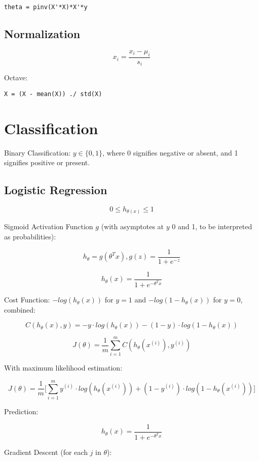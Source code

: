 \documentclass[a4paper,11pt]{scrartcl}
\begin{document}
\begin{verbatim}
theta = pinv(X'*X)*X'*y
\end{verbatim}

\subsection{Normalization}

$$ x_i = \frac{x_i - \mu_i}{s_i} $$

Octave:

\begin{verbatim}
X = (X - mean(X)) ./ std(X)
\end{verbatim}

\section{Classification}

Binary Classification: $y \in \{0, 1\}$, where 0 signifies negative or absent, and 1 signifies positive or present.

\subsection{Logistic Regression}

$$ 0 \leq h_{\theta(x)} \leq 1 $$

Sigmoid Activation Function $g$ (with asymptotes at $y$ 0 and 1, to be interpreted as probabilities):

$$ h_{\theta} = g(\theta^{T}x), g(z) = \frac{1}{1 + e^{-z}} $$

$$ h_{\theta}(x) = \frac{1}{1+e^{-\theta^{T}x}} $$

Cost Function: $-log(h_{\theta}(x))$ for $y=1$ and $-log(1-h_{\theta}(x))$ for $y=0$, combined:

$$ C(h_{\theta}(x),y) = -y \cdot log(h_{\theta}(x)) - (1-y) \cdot log(1-h_{\theta}(x)) $$

$$ J(\theta)=\frac{1}{m} \sum^m_{i=1} C(h_{\theta}(x^{(i)}),y^{(i)}) $$

With maximum likelihood estimation:

$$ J(\theta) = \frac{1}{m} \Bigg[ \sum^m_{i=1} y^{(i)} \cdot log (h_{\theta}(x^{(i)})) + (1-y^{(i)}) \cdot log (1 - h_{\theta}(x^{(i)})) \Bigg] $$

Prediction:

$$ h_{\theta}(x) = \frac{1}{1 + e^{-\theta^{T}x}} $$

Gradient Descent (for each $j$ in $\theta$):
\end{document}

